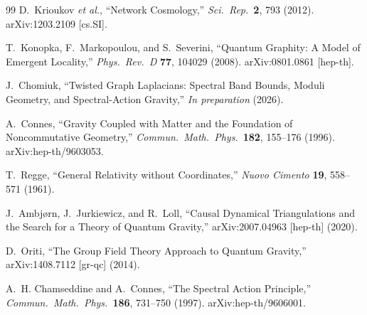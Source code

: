 \documentclass[11pt,a4paper]{article}
\theoremstyle{plain}
\theoremstyle{definition}
\begin{document}
\begin{thebibliography}{99}
D.~Krioukov \textit{et al.}, ``Network Cosmology,'' \textit{Sci.\ Rep.}\ \textbf{2}, 793 (2012). arXiv:1203.2109 [cs.SI].

T.~Konopka, F.~Markopoulou, and S.~Severini, ``Quantum Graphity: A Model of Emergent Locality,'' \textit{Phys.\ Rev.\ D} \textbf{77}, 104029 (2008). arXiv:0801.0861 [hep-th].

J.~Chomiuk, ``Twisted Graph Laplacians: Spectral Band Bounds, Moduli Geometry, and Spectral-Action Gravity,'' \textit{In preparation} (2026).

A.~Connes, ``Gravity Coupled with Matter and the Foundation of Noncommutative Geometry,'' \textit{Commun.\ Math.\ Phys.}\ \textbf{182}, 155--176 (1996). arXiv:hep-th/9603053.

T.~Regge, ``General Relativity without Coordinates,'' \textit{Nuovo Cimento} \textbf{19}, 558--571 (1961).

J.~Ambj\o rn, J.~Jurkiewicz, and R.~Loll, ``Causal Dynamical Triangulations and the Search for a Theory of Quantum Gravity,'' arXiv:2007.04963 [hep-th] (2020).

D.~Oriti, ``The Group Field Theory Approach to Quantum Gravity,'' arXiv:1408.7112 [gr-qc] (2014).

A.~H. Chamseddine and A.~Connes, ``The Spectral Action Principle,'' \textit{Commun.\ Math.\ Phys.}\ \textbf{186}, 731--750 (1997). arXiv:hep-th/9606001.

\end{thebibliography}
\end{document}
